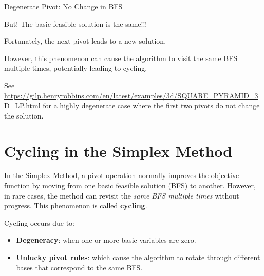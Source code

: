 \begin{remark}{Degenerate Pivot: No Change in BFS}{}
\end{remark}

But!  The basic feasible solution is the same!!!

Fortunately, the next pivot leads to a new solution.

However, this phenomenon can cause the algorithm to visit the same BFS multiple times, potentially leading to cycling.

See \url{https://gilp.henryrobbins.com/en/latest/examples/3d/SQUARE_PYRAMID_3D_LP.html} for a highly degenerate case where the first two pivots do not change the solution.

\section{Cycling in the Simplex Method}

In the Simplex Method, a pivot operation normally improves the objective function by moving from one basic feasible solution (BFS) to another. However, in rare cases, the method can revisit the \emph{same BFS multiple times} without progress. This phenomenon is called \textbf{cycling}.

Cycling occurs due to:
\begin{itemize}
  \item \textbf{Degeneracy}: when one or more basic variables are zero.
  \item \textbf{Unlucky pivot rules}: which cause the algorithm to rotate through different bases that correspond to the same BFS.
\end{itemize}

